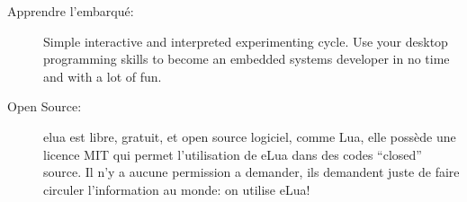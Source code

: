 \begin{description}
 \item[Apprendre l'embarqué: ] Simple interactive and interpreted experimenting cycle. Use your desktop programming skills to become an embedded systems developer in no time and with a lot of fun.

 \item[Open Source:] elua est libre, gratuit, et open source logiciel, comme Lua, elle possède une licence MIT qui permet l'utilisation de eLua dans des 
codes ``closed'' source. Il n'y a aucune permission a demander, ils demandent juste de faire circuler l'information au monde: on utilise eLua!
\end{description}


 







